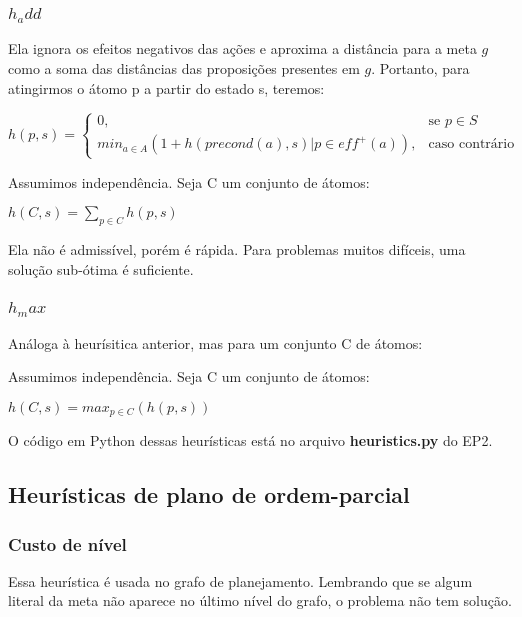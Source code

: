 \documentclass[12pt,letterpaper]{article}
\begin{document}
	\subsubsection*{$h_add$} 
	Ela ignora os efeitos negativos das ações e aproxima a distância para a meta $g$ como a soma das distâncias das proposições presentes em $g$. Portanto, para atingirmos o átomo p a partir do estado s, teremos:
	
	\begin{center}
		$h(p, s) = \left \{ \begin{matrix} 0, & \mbox{se }p \in S \\ min_{a \in A}(1+h(precond(a),s) | p \in eff^+(a)), & \mbox{caso contrário} \end{matrix} \right.$
	\end{center}
		
	Assumimos independência. Seja C um conjunto de átomos:
	
	\begin{center}
		$h(C,s) = \sum_{p \in C}^{} h(p,s)$
	\end{center}
	
	Ela não é admissível, porém é rápida. Para problemas muitos difíceis, uma solução sub-ótima é suficiente.
	
	\subsubsection*{$h_max$}
	
	Análoga à heurísitica anterior, mas para um conjunto C de átomos:
	
	Assumimos independência. Seja C um conjunto de átomos:
	
	\begin{center}
		$h(C,s) = max_{p \in C} (h(p,s))$
	\end{center}
	
	O código em Python dessas heurísticas está no arquivo \textbf{heuristics.py} do EP2.
	
	\subsection*{Heurísticas de plano de ordem-parcial}
	
	\subsubsection*{Custo de nível}
	
	Essa heurística é usada no grafo de planejamento. Lembrando que se algum literal da meta não aparece no último nível do grafo, o problema não tem solução.
	
\end{document}
